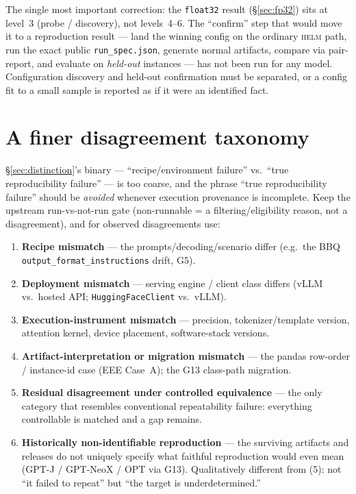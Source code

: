 \documentclass[11pt]{report}
\newcommand{\code}[1]{\texttt{#1}}
\newcommand{\file}[1]{\texttt{#1}}
\begin{document}
The single most important correction: the \code{float32} result (\S\ref{sec:fp32})
sits at level~3 (probe / discovery), not levels~4--6. The ``confirm'' step that
would move it to a reproduction result --- land the winning config on the ordinary
\textsc{helm} path, run the exact public \file{run\_spec.json}, generate normal
artifacts, compare via pair-report, and evaluate on \emph{held-out} instances --- has
not been run for any model. Configuration discovery and held-out confirmation must be
separated, or a config fit to a small sample is reported as if it were an identified
fact.

\section{A finer disagreement taxonomy}

\S\ref{sec:distinction}'s binary --- ``recipe/environment failure'' vs.\ ``true
reproducibility failure'' --- is too coarse, and the phrase ``true reproducibility
failure'' should be \emph{avoided} whenever execution provenance is incomplete. Keep
the upstream run-vs-not-run gate (non-runnable = a filtering/eligibility reason, not
a disagreement), and for observed disagreements use:

\begin{enumerate}[nosep]
  \item \textbf{Recipe mismatch} --- the prompts/decoding/scenario differ (e.g.\ the
        BBQ \code{output\_format\_instructions} drift, G5).
  \item \textbf{Deployment mismatch} --- serving engine / client class differs (vLLM
        vs.\ hosted API; \code{HuggingFaceClient} vs.\ vLLM).
  \item \textbf{Execution-instrument mismatch} --- precision, tokenizer/template
        version, attention kernel, device placement, software-stack versions.
  \item \textbf{Artifact-interpretation or migration mismatch} --- the pandas
        row-order / instance-id case (EEE Case~A); the G13 class-path migration.
  \item \textbf{Residual disagreement under controlled equivalence} --- the only
        category that resembles conventional repeatability failure: everything
        controllable is matched and a gap remains.
  \item \textbf{Historically non-identifiable reproduction} --- the surviving
        artifacts and releases do not uniquely specify what faithful reproduction
        would even mean (GPT-J / GPT-NeoX / OPT via G13). Qualitatively different from
        (5): not ``it failed to repeat'' but ``the target is underdetermined.''
\end{enumerate}
\end{document}
